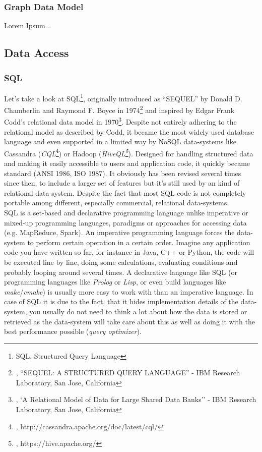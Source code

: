 {\subsubsection{Graph Data Model}
\label{tf_dma_datamodels_gdm}

Lorem Ipsum...
\newpage
\subsection{Data Access}
\label{tf_dma_dataaccess}

\subsubsection{SQL}
\label{tf_dma_dataaccess_sql}

Let's take a look at SQL\footnote{SQL, Structured Query Language}, originally introduced as ``SEQUEL'' by Donald D. Chamberlin and Raymond F. Boyce in 1974\footnote{\cite{SQLIBM}, ``SEQUEL: A STRUCTURED QUERY LANGUAGE'' - IBM Research Laboratory, San Jose, California} and inspired by Edgar Frank Codd's relational data model in 1970\footnote{\cite{CODDRDM}, `A Relational Model of Data for Large Shared Data Banks'' - IBM Research Laboratory, San Jose, California}. Despite not entirely adhering to the relational model as described by Codd, it became the most widely used database language and even supported in a limited way by NoSQL data-systems like Cassandra (\textit{CQL}\footnote{\cite{CQL}, http://cassandra.apache.org/doc/latest/cql/}) or Hadoop (\textit{HiveQL\footnote{\cite{AHW}, https://hive.apache.org/}}).
Designed for handling structured data and making it easily accessible to users and application code, it quickly became standard (ANSI 1986, ISO 1987). It obviously has been revised several times since then, to include a larger set of features but it's still used by an kind of relational data-system. Despite the fact that most SQL code is not completely portable among different, especially commercial, relational data-systems.\\
SQL is a set-based and declarative programming language unlike imperative or mixed-up programming languages, paradigms or approaches for accessing data (e.g. MapReduce, Spark). An imperative programming language forces the data-system to perform certain operation in a certain order. Imagine any application code you have written so far, for instance in Java, C++ or Python, the code will be executed line by line, doing some calculations, evaluating conditions and probably looping around several times. A declarative language like SQL (or programming languages like \textit{Prolog} or \textit{Lisp}, or even build languages like \textit{make}/\textit{cmake}) is usually more easy to work with than an imperative language. In case of SQL it is due to the fact, that it hides implementation details of the data-system, you usually do not need to think a lot about how the data is stored or retrieved as the data-system will take care about this as well as doing it with the best performance possible (\textit{query optimizer}).
}
